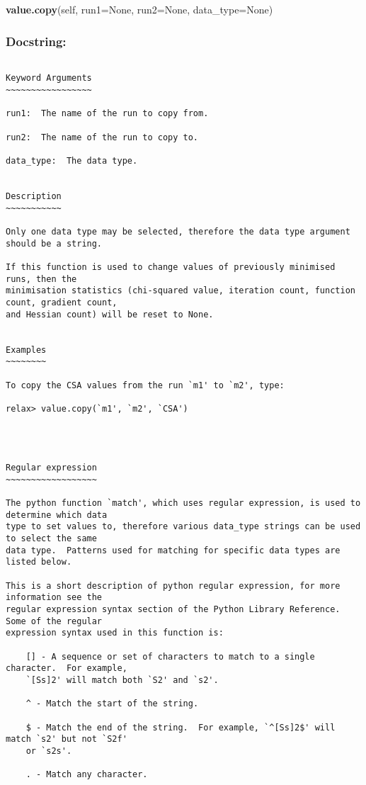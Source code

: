 \textsf{\textbf{value.copy}(self, run1=None, run2=None, data\_type=None)
}


\subsubsection{Docstring:}

{\scriptsize
\begin{verbatim}

Keyword Arguments
~~~~~~~~~~~~~~~~~

run1:  The name of the run to copy from.

run2:  The name of the run to copy to.

data_type:  The data type.


Description
~~~~~~~~~~~

Only one data type may be selected, therefore the data type argument should be a string.

If this function is used to change values of previously minimised runs, then the
minimisation statistics (chi-squared value, iteration count, function count, gradient count,
and Hessian count) will be reset to None.


Examples
~~~~~~~~

To copy the CSA values from the run `m1' to `m2', type:

relax> value.copy(`m1', `m2', `CSA')




Regular expression
~~~~~~~~~~~~~~~~~~

The python function `match', which uses regular expression, is used to determine which data
type to set values to, therefore various data_type strings can be used to select the same
data type.  Patterns used for matching for specific data types are listed below.

This is a short description of python regular expression, for more information see the
regular expression syntax section of the Python Library Reference.  Some of the regular
expression syntax used in this function is:

    [] - A sequence or set of characters to match to a single character.  For example,
    `[Ss]2' will match both `S2' and `s2'.

    ^ - Match the start of the string.

    $ - Match the end of the string.  For example, `^[Ss]2$' will match `s2' but not `S2f'
    or `s2s'.

    . - Match any character.


\end{verbatim}}
